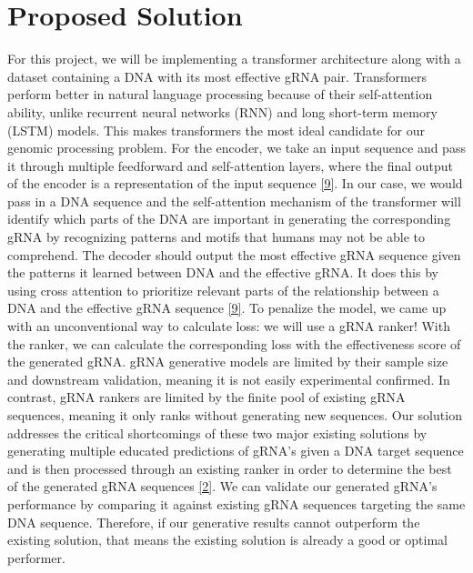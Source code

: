 \documentclass{article}
\begin{document}
\section{Proposed Solution}
For this project, we will be implementing a transformer architecture along with a dataset containing a DNA with its most effective gRNA pair. Transformers perform better in natural language processing because of their self-attention ability, unlike recurrent neural networks (RNN) and long short-term memory (LSTM) models. This makes transformers the most ideal candidate for our genomic processing problem. For the encoder, we take an input sequence and pass it through multiple feedforward and self-attention layers, where the final output of the encoder is a representation of the input sequence \hyperref[Reference 9]{[9]}. In our case, we would pass in a DNA sequence and the self-attention mechanism of the transformer will identify which parts of the DNA are important in generating the corresponding gRNA by recognizing patterns and motifs that humans may not be able to comprehend. The decoder should output the most effective gRNA sequence given the patterns it learned between DNA and the effective gRNA. It does this by using cross attention to prioritize relevant parts of the relationship between a DNA and the effective gRNA sequence \hyperref[Reference 9]{[9]}. To penalize the model, we came up with an unconventional way to calculate loss: we will use a gRNA ranker! With the ranker, we can calculate the corresponding loss with the effectiveness score of the generated gRNA. gRNA generative models are limited by their sample size and downstream validation, meaning it is not easily experimental confirmed. In contrast, gRNA rankers are limited by the finite pool of existing gRNA sequences, meaning it only ranks without generating new sequences. Our solution addresses the critical shortcomings of these two major existing solutions by generating multiple educated predictions of gRNA’s given a DNA target sequence and is then processed through an existing ranker in order to determine the best of the generated gRNA sequences \hyperref[Reference 2]{[2]}. We can validate our generated gRNA's performance by comparing it against existing gRNA sequences targeting the same DNA sequence. Therefore, if our generative results cannot outperform the existing solution, that means the existing solution is already a good or optimal performer.
\end{document}
